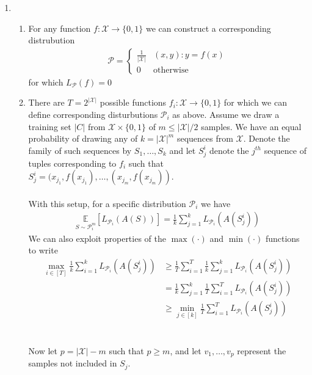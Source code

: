 \documentclass[11pt,letter]{article}
\begin{document}
\begin{enumerate}
\item \begin{enumerate}
    \item For any function $f: \mathcal X \to \{0,1\}$ we can construct a corresponding distrubution
    \begin{align*}
        \mathcal P = 
        \begin{cases}
            \frac{1}{\vert \mathcal X \vert} & (x,y): y = f(x) \\
            0 & \text{otherwise}
        \end{cases}
    \end{align*}
    for which $L_{\mathcal P}(f) = 0$
    \item There are $T = 2^{\vert \mathcal X \vert}$ possible functions $f_i: \mathcal X \to \{0,1\}$ for which we can define corresponding disturbutions $\mathcal P_i$ as above.
    Assume we draw a training set $\vert C \vert$ from $\mathcal X \times \{0,1\}$ of $m \le \vert \mathcal X \vert / 2$ samples.
    We have an equal probability of drawing any of $k = \vert \mathcal X \vert^m$ sequences from $\mathcal X$. 
    Denote the family of such sequences by $S_1, \dots, S_k$ and let $S_j^i$ denote the $j^{th}$ sequence of tuples corresponding to $f_i$ such that $S_j^i = (x_{j_1},f(x_{j_1}), \dots, (x_{j_m},f(x_{j_m}))$.
    \\ \\
    With this setup, for a specific distribution $\mathcal P_i$ we have
    \begin{align*}
            \underset{S \sim \mathcal P_i^m}{\mathbb E} [L_{\mathcal P_i}(A(S))] = \frac{1}{k} \sum_{j=1}^k L_{\mathcal P_i} (A(S_j^i))
    \end{align*}
    We can also exploit properties of the $\max(\cdot)$ and $\min(\cdot)$ functions to write
    \begin{align*}
        \max_{i \in [T]} \frac{1}{k} \sum_{i=1}^k L_{\mathcal P_i} (A(S_j^i))
        & \ge \frac{1}{T} \sum_{i=1}^T \frac{1}{k} \sum_{j=1}^k L_{\mathcal P_i}(A(S_j^i)) \\
        & = \frac{1}{k} \sum_{j=1}^k \frac{1}{T} \sum_{i=1}^T L_{\mathcal P_i}(A(S_j^i)) \\
        & \ge \min_{j \in [k]} \frac{1}{T} \sum_{i=1}^T L_{\mathcal P_i}(A(S_j^i))
    \end{align*}
    \\ \\
    Now let $p = \vert \mathcal X \vert - m$ such that $p \ge m$, and let $v_1, \dots, v_p$ represent the samples not included in $S_j$.

\end{enumerate}
\end{enumerate}
\end{document}
